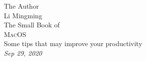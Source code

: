 \begin{titlepage}
  \raggedleft
      {\Large The Author\\ Li Mingming\\[1in] }
  {\large The Small Book of\\}
  {\Huge\scshape MacOS\\[.2in]}
  {\large Some tips that may improve your productivity\\}
  \vfill
  {\itshape Sep 29, 2020}
\end{titlepage}

